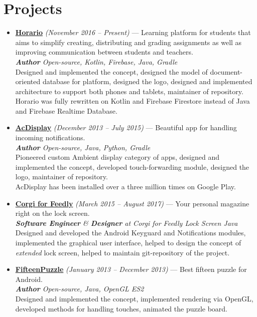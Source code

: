 \documentclass[a4paper]{article}
\begin{document}
	\section*{Projects}
	\begin{itemize}
		\item \href{http://artemchep.com/horario/}{\textbf{Horario}} \textit{(November 2016 -- Present)} --- Learning platform for students that aims to simplify creating, distributing and grading assignments as well as improving communication between students and teachers. \\[0.2em]
		{\footnotesize \textit{\textbf{Author} \hfill Open-source, Kotlin, Firebase, Java, Gradle}} \\[0.2em]
		Designed and implemented the concept, designed the model of document-oriented database for platform, designed the logo, designed and implemented architecture to support both phones and tablets, maintainer of repository. \\[0.2em]
		Horario was fully rewritten on Kotlin and Firebase Firestore instead of Java and Firebase Realtime Database. 
		
		\item \href{http://artemchep.com/acdisplay/}{\textbf{AcDisplay}} \textit{(December 2013 -- July 2015)} --- Beautiful app for handling incoming notifications. \\[0.2em]
		{\footnotesize \textit{\textbf{Author} \hfill Open-source, Java, Python, Gradle}} \\[0.2em]
		Pioneered custom Ambient display category of apps, designed and implemented the concept, developed touch-forwarding module, designed the logo, maintainer of repository.\\[0.2em]
		AcDisplay has been installed over a three million times on Google Play.

		\item \href{http://getcorgi.com/}{\textbf{Corgi for Feedly}} \textit{(March 2015 – August 2017)} --- Your personal magazine right on the lock screen. \\[0.2em]
		{\footnotesize \textit{\textbf{Software Engineer} \& \textbf{Designer} at Corgi for Feedly Lock Screen \hfill Java}} \\[0.2em]
		Designed and developed the Android Keyguard and Notifications modules, implemented the graphical user interface, helped to design the concept of \textit{extended} lock screen, helped to maintain git-repository of the project.
		
		\item \href{https://play.google.com/store/apps/details?id=com.achep.fifteenpuzzle}{\textbf{FifteenPuzzle}} \textit{(January 2013 -- December 2013)} --- Best fifteen puzzle for Android. \\[0.2em]
		{\footnotesize \textit{\textbf{Author} \hfill Open-source, Java, OpenGL ES2}} \\[0.2em]
		Designed and implemented the concept, implemented rendering via OpenGL, developed methods for handling touches, animated the puzzle board.
		

\end{itemize}
\end{document}

